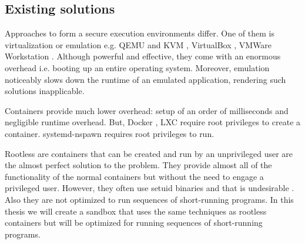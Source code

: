 \documentclass[en]{pracamgr}
\begin{document}
\subsection{Existing solutions}

Approaches to form a secure execution environments differ. One of them is virtualization or emulation e.g. QEMU \cite{qemu_website} and KVM \cite{kvm_website}, VirtualBox \cite{virtualbox_website}, VMWare Workstation \cite{vmware_workstation_website}. Although powerful and effective, they come with an enormous overhead i.e. booting up an entire operating system. Moreover, emulation noticeably slows down the runtime of an emulated application, rendering such solutions inapplicable.

Containers provide much lower overhead: setup of an order of milliseconds and negligible runtime overhead. But, Docker \cite{Merkel:2014:DLL:2600239.2600241}, LXC \cite{conf/cisis/BeserraMEBSF15} require root privileges to create a container. systemd-nspawn \cite{systemd_nspawn} requires root privileges to run.

Rootless are containers \cite{rootless_containers_rs} that can be created and run by an unprivileged user are the almost perfect solution to the problem. They provide almost all of the functionality of the normal containers but without the need to engage a privileged user. However, they often use setuid binaries and that is undesirable \cite{podman_rootless_containers_presentation}. Also they are not optimized to run sequences of short-running programs. In this thesis we will create a sandbox that uses the same techniques as rootless containers but will be optimized for running sequences of short-running programs.




\end{document}

